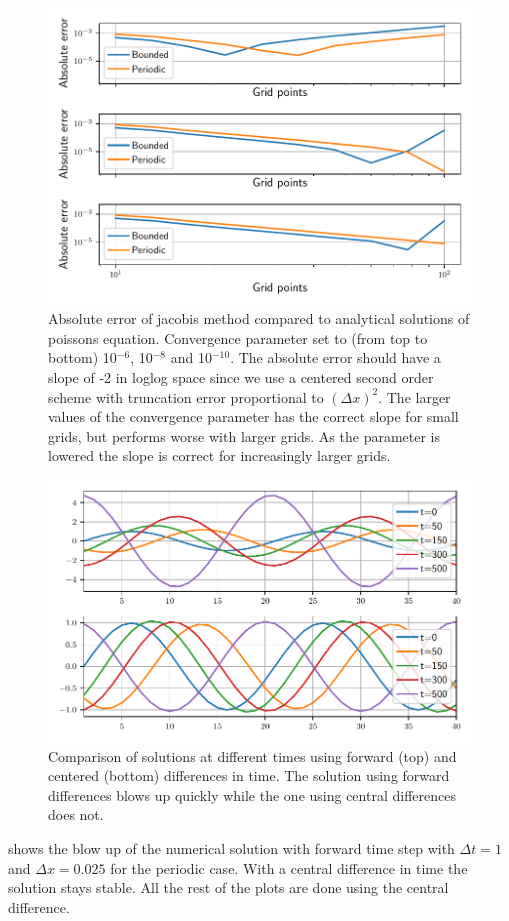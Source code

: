 \begin{figure}[htp]
  \centering
  \includegraphics[width=\textwidth]{../figures/error_jacobi.pdf}
  \caption{Absolute error of jacobis method
  compared to analytical solutions of poissons equation. Convergence parameter set to (from top to bottom) 10$^{-6}$, 10$^{-8}$ and 10$^{-10}$.
  The absolute error should have a slope of -2 in loglog space since we use
  a centered second order scheme with truncation error proportional to $(\Delta x)^2$.
  The larger values of the convergence parameter has the correct slope for small
  grids, but performs worse with larger grids. As the parameter is lowered the
  slope is correct for increasingly larger grids.}
  \label{fig:error_jacobi}
\end{figure}


\begin{figure}[htp]
  \centering
  \includegraphics[width=\textwidth]{../figures/compare_dt_1.pdf}
  \caption{Comparison of solutions at different times using forward (top) and
  centered (bottom) differences in time. The solution using forward differences
  blows up quickly while the one using central differences does not.}
  \label{fig:compare}
\end{figure}


 shows the blow up of the numerical solution with forward
time step with $\Delta t = 1$ and $\Delta x = 0.025$ for the periodic case.
With a central difference in time the solution stays stable.
All the rest of the plots are done using the central difference.
